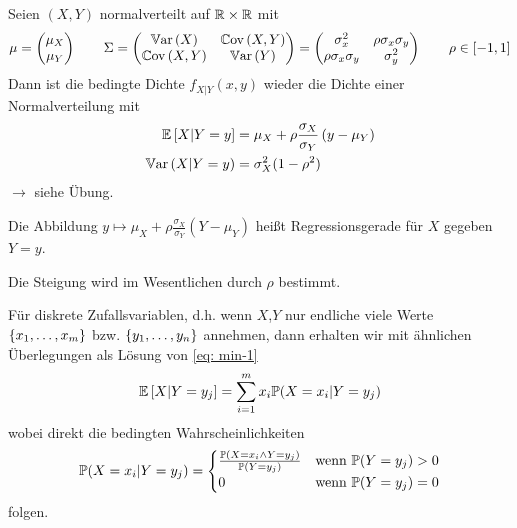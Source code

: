 \begin{*beispiel}
	Seien $(X,Y)$ normalverteilt auf $\R \times \R$ mit
	\begin{equation*}
	\mu = \begin{pmatrix} \mu_X \\ \mu_Y \end{pmatrix} \qquad \Sigma 
	= \begin{pmatrix} \Var[X] & \Cov{X}{Y} \\ \Cov{X}{Y} & \Var[Y] \end{pmatrix}
	= \begin{pmatrix}
	\sigma_x^2 & \rho \sigma_x \sigma_y \\ \rho \sigma_x \sigma_y & \sigma_y^2
	\end{pmatrix}
	\qquad \rho \in [-1,1]
	\end{equation*}
	Dann ist die bedingte Dichte $f_{X|Y}(x,y)$ wieder die Dichte einer Normalverteilung mit
	\begin{equation*}
	\begin{aligned}
	\EW[X|Y=y] &= \mu_X + \rho \frac{\sigma_X}{\sigma_Y} \brackets{y - \mu_Y} \\
	\Var[X|Y=y] &= \sigma_X^2 (1-\rho^2)
	\end{aligned}
	\end{equation*}
	$\to$ siehe Übung.
	
	Die Abbildung $y \mapsto \mu_X + \rho \frac{\sigma_X}{\sigma_Y}(Y-\mu_Y)$ heißt Regressionsgerade für $X$ gegeben $Y = y$.
	
	
	Die Steigung wird im Wesentlichen durch $\rho$ bestimmt.
	
	Für diskrete Zufallsvariablen, d.h. wenn $X$,$Y$ nur endliche viele Werte $\menge{x_1, \dots , x_m}$ bzw. $\menge{y_1, \dots, y_n}$ annehmen, dann erhalten wir mit ähnlichen Überlegungen als Lösung von \eqref{eq: min-1} 
	\begin{equation*}
	\EW[X | Y=y_j] = \sum_{i=1}^m x_i \P(X=x_i | Y=y_j)
	\end{equation*}
	wobei direkt die bedingten Wahrscheinlichkeiten
	\begin{equation*}
	\P(X=x_i | Y=y_j) = \begin{cases}
	\frac{\P(X=x_i \land Y = y_j)}{\P(Y=y_j)} & \text{wenn } \P(Y = y_j) > 0 \\
	0 & \text{wenn } \P(Y=y_j) = 0
	\end{cases}
	\end{equation*}
	folgen.
\end{*beispiel}

